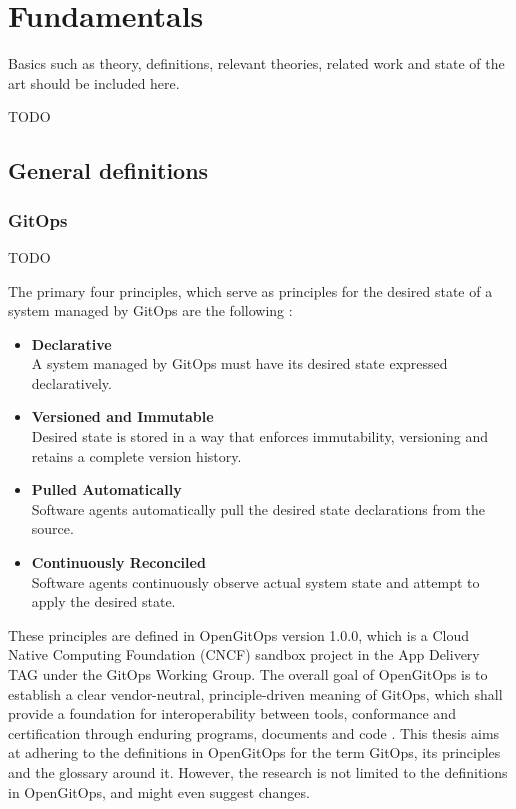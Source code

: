 \chapter{Fundamentals} 	%

Basics such as theory, definitions, relevant theories, related work and state of the art should be included here.

TODO

\section{General definitions}

\subsection{GitOps}

TODO

\noindent
The primary four principles,
which serve as principles for the desired state of a
system managed by GitOps are the following \autocite{gitopsPrinciplesv100}:

\begin{itemize}
	\item \textbf{Declarative} \\
		A system managed by GitOps must have its desired state expressed declaratively.
	\item \textbf{Versioned and Immutable} \\
		Desired state is stored in a way that enforces immutability, versioning and retains a complete version history.
	\item \textbf{Pulled Automatically} \\
		Software agents automatically pull the desired state declarations from the source.
	\item \textbf{Continuously Reconciled} \\
		Software agents continuously observe actual system state and attempt to apply the desired state.
\end{itemize}


\noindent
These principles are defined in OpenGitOps version 1.0.0,
which is a Cloud Native Computing Foundation (CNCF) sandbox project
in the App Delivery TAG 
under the GitOps Working Group.
The overall goal of OpenGitOps is to establish a clear vendor-neutral,
principle-driven meaning of GitOps,
which shall provide a foundation for interoperability between tools, conformance and certification through enduring programs, documents and code
\autocite{opengitopsDocuments}.
This thesis aims at adhering to the definitions in OpenGitOps
for the term GitOps, its principles and the glossary around it.
However, the research is not limited to the definitions in OpenGitOps,
and might even suggest changes.







